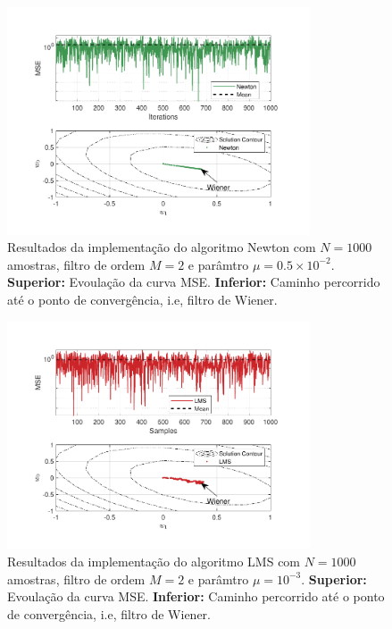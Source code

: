 \begin{enumerate}
        \begin{figure}[!htp]
            \centering
            \includegraphics[width=0.80\textwidth]{fig/hw3p4-newton.pdf}
            \caption{Resultados da implementação do algoritmo Newton com $N = 1000$ amostras, filtro de ordem $M = 2$ e parâmtro $\mu = 0.5 \times 10^{-2}$. \textbf{Superior:} Evoulação da curva MSE. \textbf{Inferior:} Caminho percorrido até o ponto de convergência, i.e, filtro de Wiener.}
            \label{fig:hw3p4-newton}
        \end{figure}

        \begin{figure}[!htp]
            \centering
            \includegraphics[width=0.80\textwidth]{fig/hw3p4-lms.pdf}
            \caption{Resultados da implementação do algoritmo LMS com $N = 1000$ amostras, filtro de ordem $M = 2$ e parâmtro $\mu = 10^{-3}$. \textbf{Superior:} Evoulação da curva MSE. \textbf{Inferior:} Caminho percorrido até o ponto de convergência, i.e, filtro de Wiener.}
            \label{fig:hw3p4-lms}
        \end{figure}


\end{enumerate}
